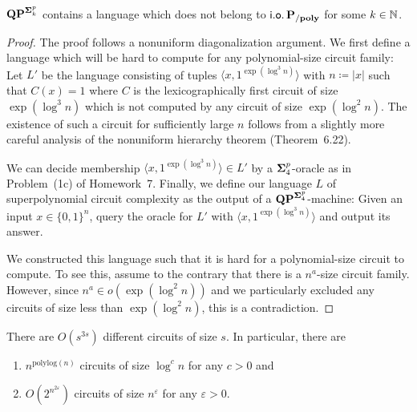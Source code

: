 \documentclass[11pt]{article}
\begin{document}
\begin{lemma}
	\label{lem:qp-super-circ}
	$\mathbf{QP}^{\mathbf{\Sigma}^p_k}$ contains a language which does not belong
	to $\mathsf{i.o.}\, \mathbf{P_{/poly}}$ for some $k \in {\mathbb{N}}$.
\end{lemma}

\begin{proof}
	The proof follows a nonuniform diagonalization argument. We first define
	a language which will be hard to compute for any polynomial-size circuit
	family:
	Let $L'$ be the language consisting of tuples
	$\langle x, 1^{\exp(\log^3 n)} \rangle$
	with $n \coloneqq |x|$
	such that $C(x) = 1$ where $C$ is the
	lexicographically first circuit of size $\exp(\log^3 n)$ which is not
	computed by any circuit of size $\exp(\log^2 n)$.
	The existence of such a circuit for sufficiently large $n$ follows from a
	slightly more careful analysis of the nonuniform hierarchy theorem
	(Theorem~6.22).
	
	We can decide membership $\langle x, 1^{\exp(\log^3 n)} \rangle \in L'$
	by a $\mathbf{\Sigma}^p_4$-oracle as in Problem~(1c) of Homework~7.
	Finally, we define our language $L$ of superpolynomial circuit complexity
	as the output of a $\mathbf{QP}^{\mathbf{\Sigma}^p_4}$-machine: Given an input
	$x \in \{0,1\}^n$, query the oracle for $L'$ with
	$\langle x, 1^{\exp(\log^3 n)} \rangle$ and output its answer.
	
	We constructed this language such that it is hard for a polynomial-size
	circuit to compute. To see this, assume to the contrary that there is
	a $n^a$-size circuit family.
	However, since $n^a \in o(\exp(\log^2 n))$ and we particularly excluded any
	circuits of size less than $\exp(\log^2 n)$, this is a contradiction.
\end{proof}

\begin{lemma}
  \label{lem:num-of-circs}
  There are $O(s^{3s})$ different circuits of size $s$.
  In particular, there are
  \begin{enumerate}
    \item $n^{\mathrm{polylog}(n)}$ circuits of size $\log^c n$ for any
      $c > 0$ and

    \item $O(2^{n^{2 \varepsilon}})$ circuits of size
      $n^\varepsilon$ for any $\varepsilon > 0$.
  \end{enumerate}
\end{lemma}
\end{document}
